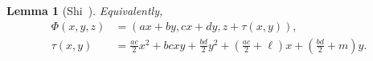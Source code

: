 \documentclass[a4paper,11pt]{amsart}
\newtheorem{lemma}[theorem]{Lemma}
\theoremstyle{remark}
\newcommand{\bH}{\mathbb{H}} %
\begin{document}
\begin{lemma}[Shi~\cite{Shi14a,Shi14b}]
    Equivalently,
    \begin{equation}
        \label{eq:def-Phi}
        \begin{aligned}
            \Phi (x,y,z) & = \left( ax + by, cx + dy, z + \tau(x,y) \right),                                                                        \\
            \tau(x,y)    & = \tfrac{ac}{2} x^2 + bc xy + \tfrac{bd}{2} y^2 + \left(\tfrac{ac}{2} + \ell\right)x +  \left(\tfrac{bd}{2} + m\right)y.
        \end{aligned}
    \end{equation}
\end{lemma}


\end{document}

